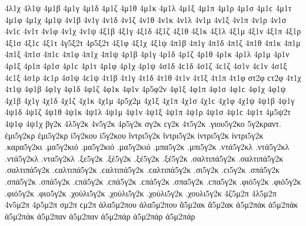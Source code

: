 {4λ1χ 
4λ1ψ 
4μ1β 
4μ1γ 
4μ1δ 
4μ1ζ 
4μ1θ 
4μ1κ 
4μ1λ 
4μ1ξ 
4μ1π 
4μ1ρ 
4μ1σ 4μ1ϲ 
4μ1τ 
4μ1φ 
4μ1χ 
4μ1ψ 
4ν1β 
4ν1γ 
4ν1δ 
4ν1ζ 
4ν1θ 
4ν1κ 
4ν1λ 
4ν1μ 
4ν1ξ 
4ν1π 
4ν1ρ 
4ν1σ 4ν1ϲ 
4ν1τ 
4ν1φ 
4ν1χ 
4ν1ψ 
4ξ1β 
4ξ1γ 
4ξ1δ 
4ξ1ζ 
4ξ1θ 
4ξ1κ 
4ξ1λ 
4ξ1μ 
4ξ1ν 
4ξ1π 
4ξ1ρ 
4ξ1σ 4ξ1ϲ 
4ξ1τ 
4γ5ξ2τ   %
4ρ5ξ2τ   %
4ξ1φ 
4ξ1χ 
4ξ1ψ 
4π1β 
4π1γ 
4π1δ 
4π1ζ 
4π1θ 
4π1κ 
4π1μ 
4π1ξ 
4π1σ 4π1ϲ 
4π1φ 
4π1χ 
4π1ψ 
4ρ1β 
4ρ1γ 
4ρ1δ 
4ρ1ζ 
4ρ1θ 
4ρ1κ 
4ρ1λ 
4ρ1μ 
4ρ1ν 
4ρ1ξ 
4ρ1π 
4ρ1σ 4ρ1ϲ 
4ρ1τ 
4ρ1φ 
4ρ1χ 
4ρ1ψ 
4σ1δ 4ϲ1δ   %
4σ1ζ 4ϲ1ζ 
4σ1ν 4ϲ1ν   %
4σ1ξ 4ϲ1ξ 
4σ1ρ 4ϲ1ρ 
4σ1ψ 4ϲ1ψ 
4τ1β 
4τ1γ 
4τ1δ 
4τ1θ 
4τ1ν 
4τ1ξ 
4τ1π 
4τ1φ 
στ2φ ϲτ2φ   %
4τ1χ 
4τ1ψ 
4φ1β 
4φ1γ 
4φ1δ 
4φ1ζ 
4φ1κ   %
4φ1ν 
4ρ5φ2ν   %
4φ1ξ 
4φ1π 
4φ1σ 4φ1ϲ 
4φ1χ 
4φ1ψ 
4χ1β 
4χ1γ 
4χ1δ 
4χ1ζ 
4χ1κ 
4χ1μ 
4ρ5χ2μ   %
4χ1ξ 
4χ1π 
4χ1σ 4χ1ϲ 
4χ1φ 
4χ1ψ 
4ψ1β 
4ψ1γ 
4ψ1δ 
4ψ1ζ 
4ψ1θ 
4ψ1κ 
4ψ1λ 
4ψ1μ 
4ψ1ν 
4ψ1ξ 
4ψ1π 
4ψ1ρ 
4ψ1σ 4ψ1ϲ 
4ψ1τ 
4μ5ψ2τ   %
4ψ1φ 
4ψ1χ 
βγ2κ 
4λ5γ2κ 
4ν5γ2κ 
4ρ5γ2κ 
σγ2κ ϲγ2κ 
4τ5γ2κ 
.γιου5γ2κο   %
5γ2κραντ.   %
ἐμι5γ2κρ ἐμι5γ2κρ   %
ἰ5γ2κου ἰ5γ2κου   %
ἴντρι5γ2κ ἴντρι5γ2κ   %
ἰντρι5γ2κ ἰντρι5γ2κ 
.καρα5γ2κι   %
.μα5γ2κιό .μα5γ2κιό .μα5γ2κιό   %
.μπα5γ2κ   %
.μπι5γ2κ   %
.ντά5γ2κλ .ντά5γ2κλ .ντά5γ2κλ   %
.ντα5γ2κλ   %
.ξε5γ2κ   %
.ξέ5γ2κ .ξέ5γ2κ .ξέ5γ2κ 
.σαλτιπά5γ2κ .σαλτιπά5γ2κ .σαλτιπά5γ2κ .ϲαλτιπά5γ2κ .ϲαλτιπά5γ2κ .ϲαλτιπά5γ2κ   %
.σι5γ2κ .ϲι5γ2κ   %
.σπά5γ2κ .σπά5γ2κ .σπά5γ2κ .ϲπά5γ2κ .ϲπά5γ2κ .ϲπά5γ2κ   %
.σπα5γ2κ .ϲπα5γ2κ 
.φιό5γ2κ .φιό5γ2κ .φιό5γ2κ   %
.φιο5γ2κ 
.χούλι5γ2κ .χούλι5γ2κ .χούλι5γ2κ   %
.χουλι5γ2κ 
4ζ5μ2π 
4λ5μ2π 
4ν5μ2π 
4ρ5μ2π 
σμ2π ϲμ2π 
ἀλα5μ2που ἀλα5μ2που   %
ἄ5μ2ακ ἄ5μ2ακ   %
ἀ5μ2πάκ ἀ5μ2πάκ ἀ5μ2πάκ 
ἀ5μ2παν ἀ5μ2παν   %
ἀ5μ2πάρ ἀ5μ2πάρ ἀ5μ2πάρ   %
}
